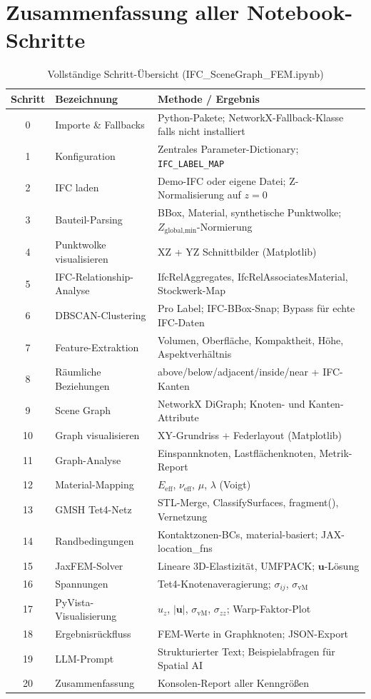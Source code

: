 \documentclass[a4paper,11pt]{article}
\begin{document}
\section{Zusammenfassung aller Notebook-Schritte}

\begin{table}[H]
\centering
\caption{Vollständige Schritt-Übersicht (IFC\_SceneGraph\_FEM.ipynb)}
\small
\begin{tabular}{clp{9cm}}
\toprule
\textbf{Schritt} & \textbf{Bezeichnung} & \textbf{Methode / Ergebnis} \\
\midrule
0 & Importe \& Fallbacks & Python-Pakete; NetworkX-Fallback-Klasse falls nicht installiert \\
1 & Konfiguration & Zentrales Parameter-Dictionary; \texttt{IFC\_LABEL\_MAP} \\
2 & IFC laden & Demo-IFC oder eigene Datei; Z-Normalisierung auf $z=0$ \\
3 & Bauteil-Parsing & BBox, Material, synthetische Punktwolke; $Z_\text{global,min}$-Normierung \\
4 & Punktwolke visualisieren & XZ + YZ Schnittbilder (Matplotlib) \\
5 & IFC-Relationship-Analyse & IfcRelAggregates, IfcRelAssociatesMaterial, Stockwerk-Map \\
6 & DBSCAN-Clustering & Pro Label; IFC-BBox-Snap; Bypass für echte IFC-Daten \\
7 & Feature-Extraktion & Volumen, Oberfläche, Kompaktheit, Höhe, Aspektverhältnis \\
8 & Räumliche Beziehungen & above/below/adjacent/inside/near + IFC-Kanten \\
9 & Scene Graph & NetworkX DiGraph; Knoten- und Kanten-Attribute \\
10 & Graph visualisieren & XY-Grundriss + Federlayout (Matplotlib) \\
11 & Graph-Analyse & Einspannknoten, Lastflächenknoten, Metrik-Report \\
12 & Material-Mapping & $E_\text{eff}$, $\nu_\text{eff}$, $\mu$, $\lambda$ (Voigt) \\
13 & GMSH Tet4-Netz & STL-Merge, ClassifySurfaces, fragment(), Vernetzung \\
14 & Randbedingungen & Kontaktzonen-BCs, material-basiert; JAX-location\_fns \\
15 & JaxFEM-Solver & Lineare 3D-Elastizität, UMFPACK; $\mathbf{u}$-Lösung \\
16 & Spannungen & Tet4-Knotenaveragierung; $\sigma_{ij}$, $\sigma_\text{vM}$ \\
17 & PyVista-Visualisierung & $u_z$, $|\mathbf{u}|$, $\sigma_\text{vM}$, $\sigma_{zz}$; Warp-Faktor-Plot \\
18 & Ergebnisrückfluss & FEM-Werte in Graphknoten; JSON-Export \\
19 & LLM-Prompt & Strukturierter Text; Beispielabfragen für Spatial AI \\
20 & Zusammenfassung & Konsolen-Report aller Kenngrößen \\
\bottomrule
\end{tabular}
\end{table}
\end{document}
